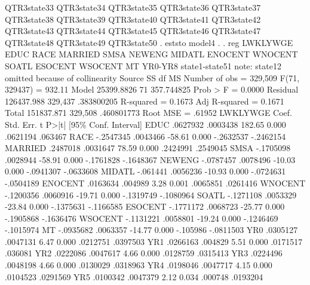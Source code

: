                QTR3state33 QTR3state34 QTR3state35 QTR3state36 QTR3state37
               QTR3state38 QTR3state39 QTR3state40 QTR3state41 QTR3state42
               QTR3state43 QTR3state44 QTR3state45 QTR3state46 QTR3state47
               QTR3state48 QTR3state49 QTR3state50
{\smallskip}
. eststo model4
{\smallskip}
. 
. reg  LWKLYWGE EDUC  RACE MARRIED SMSA NEWENG MIDATL ENOCENT WNOCENT SOATL ESOCENT WSOCENT MT YR0-YR8  state1-state51
note: state12 omitted because of collinearity
{\smallskip}
      Source {\VBAR}       SS           df       MS      Number of obs   =   329,509
   F(71, 329437)   =    932.11
       Model {\VBAR}  25399.8826        71  357.744825   Prob > F        =    0.0000
    Residual {\VBAR}  126437.988   329,437  .383800205   R-squared       =    0.1673
   Adj R-squared   =    0.1671
       Total {\VBAR}  151837.871   329,508  .460801773   Root MSE        =    .61952
{\smallskip}
    LWKLYWGE {\VBAR}      Coef.   Std. Err.      t    P>|t|     [95\% Conf. Interval]
        EDUC {\VBAR}   .0627932   .0003438   182.65   0.000     .0621194     .063467
        RACE {\VBAR}  -.2547345   .0043466   -58.61   0.000    -.2632537   -.2462154
     MARRIED {\VBAR}   .2487018   .0031647    78.59   0.000     .2424991    .2549045
        SMSA {\VBAR}  -.1705098   .0028944   -58.91   0.000    -.1761828   -.1648367
      NEWENG {\VBAR}  -.0787457   .0078496   -10.03   0.000    -.0941307   -.0633608
      MIDATL {\VBAR}   -.061441   .0056236   -10.93   0.000    -.0724631   -.0504189
     ENOCENT {\VBAR}   .0163634    .004989     3.28   0.001     .0065851    .0261416
     WNOCENT {\VBAR}  -.1200356   .0060916   -19.71   0.000    -.1319749   -.1080964
       SOATL {\VBAR}  -.1271108   .0053329   -23.84   0.000    -.1375631   -.1166585
     ESOCENT {\VBAR}  -.1771172   .0068723   -25.77   0.000    -.1905868   -.1636476
     WSOCENT {\VBAR}  -.1131221   .0058801   -19.24   0.000    -.1246469   -.1015974
          MT {\VBAR}  -.0935682   .0063357   -14.77   0.000     -.105986   -.0811503
         YR0 {\VBAR}   .0305127   .0047131     6.47   0.000     .0212751    .0397503
         YR1 {\VBAR}   .0266163    .004829     5.51   0.000     .0171517     .036081
         YR2 {\VBAR}   .0222086   .0047617     4.66   0.000     .0128759    .0315413
         YR3 {\VBAR}   .0224496   .0048198     4.66   0.000     .0130029    .0318963
         YR4 {\VBAR}   .0198046   .0047717     4.15   0.000     .0104523    .0291569
         YR5 {\VBAR}   .0100342   .0047379     2.12   0.034      .000748    .0193204
